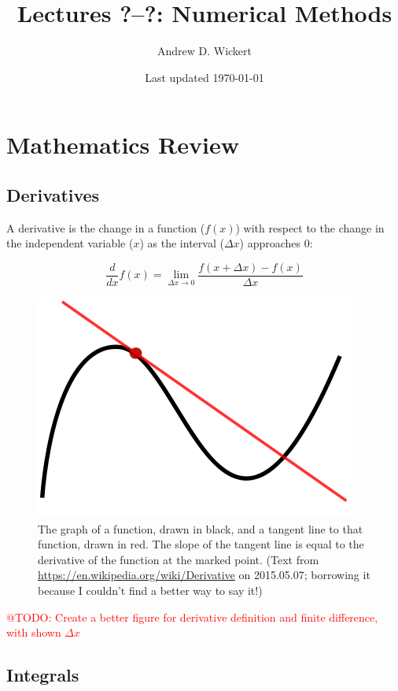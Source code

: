 \documentclass[a4paper,10pt]{scrartcl}
\title{Lectures ?--?: Numerical Methods}
\author{Andrew D. Wickert}
\date{Last updated \today}
\makeatletter
\newcommand{\todo}[1]{\textcolor{red}{@TODO: #1}}
\makeatother
\begin{document}
\maketitle

\section{Mathematics Review}

\subsection{Derivatives}

A derivative is the change in a function ($f(x)$) with respect to the change in the independent variable ($x$) as the interval ($\Delta x$) approaches 0:

\begin{equation}
 \frac{d}{{dx}}f\left( x \right) = \mathop {\lim }\limits_{\Delta x \to 0} \frac{{f\left( {x + \Delta x } \right) - f\left( x \right)}}{\Delta x }
\end{equation}

\begin{figure}[!ht]
\begin{center}
\includegraphics[width=.5\linewidth]{figures/NumericalAndMath/400px-Tangent_to_a_curve.png}
\end{center}
\caption{The graph of a function, drawn in black, and a tangent line to that function, drawn in red. The slope of the tangent line is equal to the derivative of the function at the marked point. (Text from \url{https://en.wikipedia.org/wiki/Derivative} on 2015.05.07; borrowing it because I couldn't find a better way to say it!)}
\end{figure}

\todo{Create a better figure for derivative definition and finite difference, with shown $\Delta x$}

\subsection{Integrals}
\end{document}
